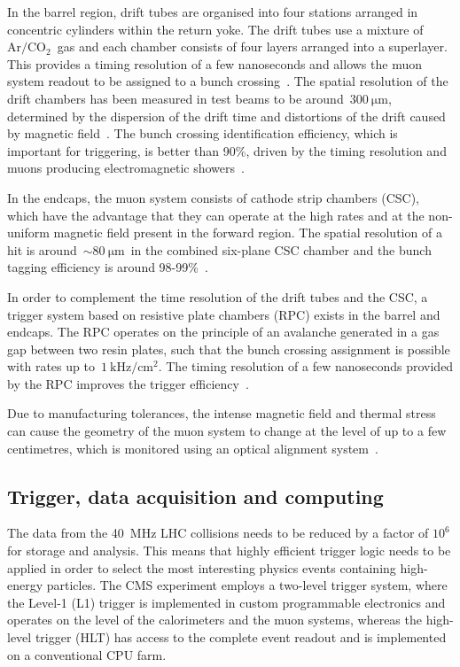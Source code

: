 In the barrel region, drift tubes are organised into four stations arranged in concentric cylinders within the return yoke. The drift tubes use a mixture of~$\mathrm{Ar}/\mathrm{CO}_2$~gas and each chamber consists of four layers arranged into a superlayer. This provides a timing resolution of a few nanoseconds and allows the muon system readout to be assigned to a bunch crossing~\cite{Chatrchyan:2008aa}. The spatial resolution of the drift chambers has been measured in test beams to be around~$300~\mathrm{\mu m}$, determined by the dispersion of the drift time and distortions of the drift caused by magnetic field~\cite{Chatrchyan:2009hg}. The bunch crossing identification efficiency, which is important for triggering, is better than 90\%, driven by the timing resolution and muons producing electromagnetic showers~\cite{Chatrchyan:2008aa}.

In the endcaps, the muon system consists of cathode strip chambers (CSC), which have the advantage that they can operate at the high rates and at the non-uniform magnetic field present in the forward region. The spatial resolution of a hit is around~$\sim 80~\mathrm{\mu m}$~in the combined six-plane CSC chamber and the bunch tagging efficiency is around 98-99\%~\cite{Chatrchyan:2008aa}.

In order to complement the time resolution of the drift tubes and the CSC, a trigger system based on resistive plate chambers (RPC) exists in the barrel and endcaps. The RPC operates on the principle of an avalanche generated in a gas gap between two resin plates, such that the bunch crossing assignment is possible with rates up to~$1~\mathrm{kHz}/\mathrm{cm}^2$. The timing resolution of a few nanoseconds provided by the RPC improves the trigger efficiency~\cite{Chatrchyan:2008aa}.

Due to manufacturing tolerances, the intense magnetic field and thermal stress can cause the geometry of the muon system to change at the level of up to a few centimetres, which is monitored using an optical alignment system~\cite{Chatrchyan:2009sr}. 

\subsection{Trigger, data acquisition and computing}
The data from the 40~MHz LHC collisions needs to be reduced by a factor of $10^6$ for storage and analysis. This means that highly efficient trigger logic needs to be applied in order to select the most interesting physics events containing high-energy particles. The CMS experiment employs a two-level trigger system, where the Level-1 (L1) trigger is implemented in custom programmable electronics and operates on the level of the calorimeters and the muon systems, whereas the high-level trigger (HLT) has access to the complete event readout and is implemented on a conventional CPU farm.

